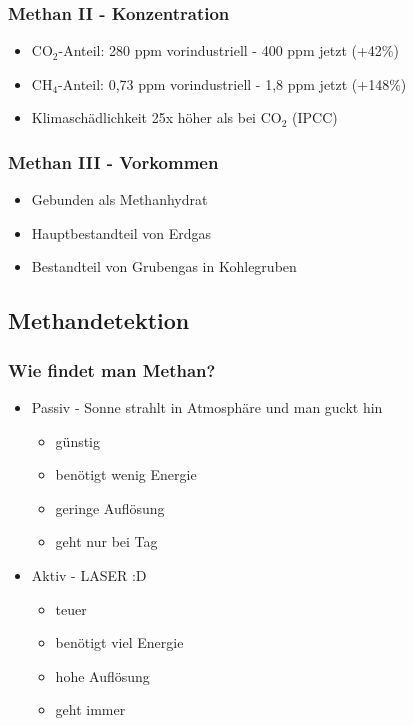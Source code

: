 \documentclass{beamer}
\begin{document}
\begin{frame}
  \frametitle{Methan II - Konzentration}
  \begin{itemize}
    \item $\mathrm{CO_2}$-Anteil: 280 ppm vorindustriell - 400 ppm jetzt (+42\%)
    \item $\mathrm{CH_4}$-Anteil: 0,73 ppm vorindustriell - 1,8 ppm jetzt (+148\%)
    \item Klimaschädlichkeit 25x höher als bei $\mathrm{CO_2}$ (IPCC)
  \end{itemize}
\end{frame}

\begin{frame}
  \frametitle{Methan III - Vorkommen}
  \begin{itemize}
    \item Gebunden als Methanhydrat
    \item Hauptbestandteil von Erdgas
    \item Bestandteil von Grubengas in Kohlegruben
  \end{itemize}
\end{frame}

\subsection{Methandetektion}
\begin{frame}
  \frametitle{Wie findet man Methan?}
  \begin{itemize}
    \item Passiv - Sonne strahlt in Atmosphäre und man guckt hin
    \begin{itemize}
      \item günstig
      \item benötigt wenig Energie
      \item geringe Auflösung
      \item geht nur bei Tag
    \end{itemize}
    \item Aktiv - LASER :D
    \begin{itemize}
      \item teuer
      \item benötigt viel Energie
      \item hohe Auflösung
      \item geht immer
    \end{itemize}
  \end{itemize}
\end{frame}
\end{document}
